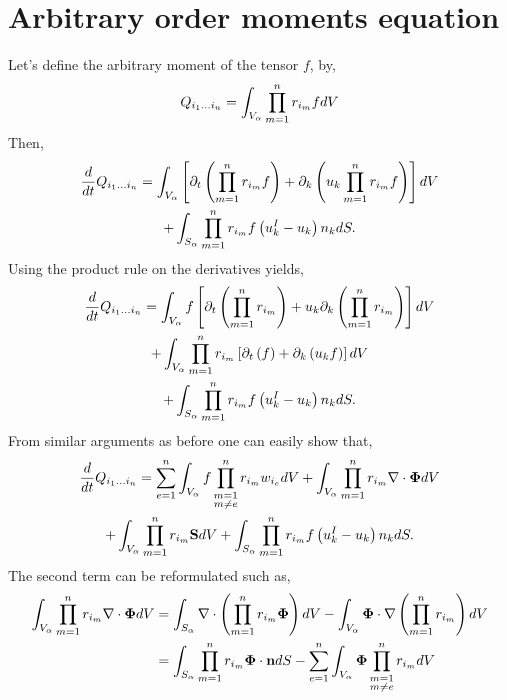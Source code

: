 
\section{Arbitrary order moments equation}
\label{ap:Moments_equations}

Let's define the arbitrary moment of the tensor $f$, by, 
\begin{equation*}
    Q_{i_1\ldots i_n}
    = \int_{V_\alpha} 
    \prod_{m=1}^{n} r_{i_m} f dV
\end{equation*}
Then,
\begin{multline*}
    \frac{d}{d t} Q_{i_1\ldots i_n}
    =\int_{V_\alpha} \left[ \partial_t \left(\prod_{m=1}^{n} r_{i_m}f\right) 
    + \partial_k \left(u_k \prod_{m=1}^{n} r_{i_m}f\right) \right]dV\\
    +\int_{S_\alpha} \prod_{m=1}^{n} r_{i_m} f \left(u^I_k - u_k\right) n_k dS.
\end{multline*}
Using the product rule on the derivatives yields, 
\begin{multline*}
    \frac{d}{d t} Q_{i_1\ldots i_n}
    =\int_{V_\alpha} f \left[ \partial_t \left(\prod_{m=1}^{n} r_{i_m}\right) 
    + u_k \partial_k \left( \prod_{m=1}^{n} r_{i_m}\right) \right]dV\\
    +\int_{V_\alpha} \prod_{m=1}^{n} r_{i_m} \left[ \partial_t \left(f\right) 
    +  \partial_k \left(u_k f \right) \right]dV\\
    +\int_{S_\alpha} \prod_{m=1}^{n} r_{i_m} f \left(u^I_k - u_k\right) n_k dS.
\end{multline*}
From similar arguments as before one can easily show that, 
\begin{multline*}
    \frac{d}{d t} Q_{i_1\ldots i_n}
    = \sum_{e=1}^{n} \int_{V_\alpha} f  \prod^{n}_{\substack{ m=1 \\   m \neq e}} r_{i_m} w_{i_e}dV
    +\int_{V_\alpha} \prod_{m=1}^{n} r_{i_m} \mathbf{\nabla}\cdot\mathbf{\Phi} dV\\
    + \int_{V_\alpha} \prod_{m=1}^{n} r_{i_m} \textbf{S} dV
    +\int_{S_\alpha} \prod_{m=1}^{n} r_{i_m} f \left(u^I_k - u_k\right) n_k dS.
\end{multline*}
The second term can be reformulated such as,
\begin{align*}
    \int_{V_\alpha} \prod_{m=1}^{n} r_{i_m} \mathbf{\nabla}\cdot\mathbf{\Phi} dV
    &= \int_{S_\alpha} \mathbf{\nabla} \cdot \left(\prod_{m=1}^{n} r_{i_m} \mathbf{\Phi} \right)dV
    - \int_{V_\alpha} \mathbf{\Phi} \cdot \mathbf{\nabla} \left(\prod_{m=1}^{n} r_{i_m} \right)dV\\
    &= \int_{S_\alpha} \prod_{m=1}^{n} r_{i_m} \mathbf{\Phi} \cdot \textbf{n}dS
    -\sum_{e=1}^{n} \int_{V_\alpha} \mathbf{\Phi}  \prod^{n}_{\substack{ m=1 \\m \neq e}} r_{i_m}  dV
\end{align*}
